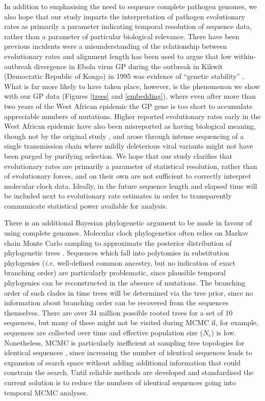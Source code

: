 \documentclass[11pt,oneside,letterpaper]{article}
\begin{document}
In addition to emphasising the need to sequence complete pathogen genomes, we also hope that our study imparts the interpretation of pathogen evolutionary rates as primarily a parameter indicating temporal resolution of sequence data, rather than a parameter of particular biological relevance.
There have been previous incidents were a misunderstanding of the relationship between evolutionary rates and alignment length has been used to argue that low within-outbreak divergence in Ebola virus GP during the outbreak in Kikwit (Democratic Republic of Kongo) in 1995 was evidence of ``genetic stability'' \citep{rodriguez_persistence_1999}.
What is far more likely to have taken place, however, is the phenomenon we show with our GP data (Figures \ref{trees} and \ref{embedding}), where even after more than two years of the West African epidemic the GP gene is too short to accumulate appreciable numbers of mutations.
Higher reported evolutionary rates early in the West African epidemic \citep{gire_genomic_2014} have also been misreported as having biological meaning, though not by the original study \citep{holmes_evolution_2016,rambaut_comment_2016}, and arose through intense sequencing of a single transmission chain where mildly deleterious viral variants might not have been purged by purifying selection.
We hope that our study clarifies that evolutionary rates are primarily a parameter of statistical resolution, rather than of evolutionary forces, and on their own are not sufficient to correctly interpret molecular clock data.
Ideally, in the future sequence length and elapsed time will be included next to evolutionary rate estimates in order to transparently communicate statistical power available for analysis.

There is an additional Bayesian phylogenetic argument to be made in favour of using complete genomes.
Molecular clock phylogenetics often relies on Markov chain Monte Carlo sampling to approximate the posterior distribution of phylogenetic trees \citep{yang_bayesian_1997}.
Sequences which fall into polytomies in substitution phylogenies (\textit{i.e.} well-defined common ancestry, but no indication of exact branching order) are particularly problematic, since plausible temporal phylogenies can be reconstructed in the absence of mutations.
The branching order of such clades in time trees will be determined via the tree prior, since no information about branching order can be recovered from the sequences themselves.
There are over 34 million possible rooted trees for a set of 10 sequences, but many of these might not be visited during MCMC if, for example, sequences are collected over time and effective population size ($N_{e}$) is low.
Nonetheless, MCMC is particularly inefficient at sampling tree topologies for identical sequences \citep{whidden_quantifying_2015}, since increasing the number of identical sequences leads to expansion of search space without adding additional information that could constrain the search.
Until reliable methods are developed and standardised the current solution is to reduce the numbers of identical sequences going into temporal MCMC analyses.
\end{document}
